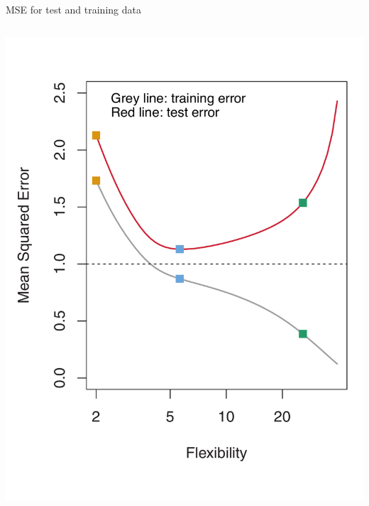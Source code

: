 \documentclass[aspectratio=169, handout]{beamer}
\begin{document}
\begin{frame}{MSE for test and training data}
\begin{columns}
\pause 
\includegraphics[scale=0.25]{figures/islr2_9b.pdf}
\end{columns}


\end{frame}
\end{document}
